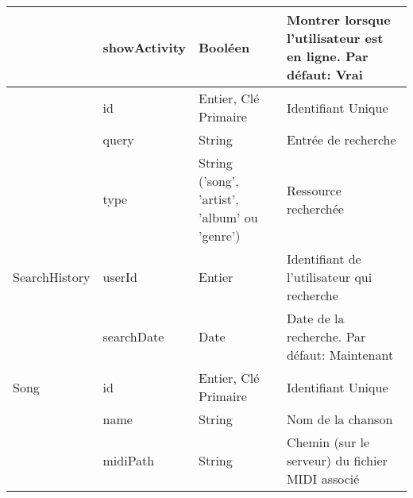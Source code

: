 \begin{longtable}[c]{@{}|p{}|p{}|p{}|p{}|@{}}
									                    & showActivity                                         & Booléen                                                                                  & Montrer lorsque l’utilisateur est en ligne. Par défaut: Vrai                             \\* \midrule
														& id                                                   & Entier, Clé Primaire                                                                     & Identifiant Unique                                                                       \\* \cmidrule(l){2-4} 
														& query                                                & String                                                                                   & Entrée de recherche                                                                      \\* \cmidrule(l){2-4} 
														& type                                                 & String ('song', 'artist',  'album' ou 'genre') & Ressource recherchée                                                                     \\* \cmidrule(l){2-4} 
	\multirow{-4}{*}{SearchHistory}						& userId                                               & Entier                                                                                   & Identifiant de l’utilisateur qui recherche                                               \\* \cmidrule(l){2-4} 
									                    & searchDate                                           & Date                                                                                     & Date de la recherche. Par défaut: Maintenant                                             \\* \midrule
	\multirow{0}{*}{Song}								& id                                                   & Entier, Clé Primaire                                                                     & Identifiant Unique                                                                       \\* \cmidrule(l){2-4} 
														& name                                                 & String                                                                                   & Nom de la chanson                                                                        \\* \cmidrule(l){2-4} 
														& midiPath                                             & String                                                                                   & Chemin (sur le serveur) du fichier MIDI associé                                          \\* \cmidrule(l){2-4} 

\end{longtable}
